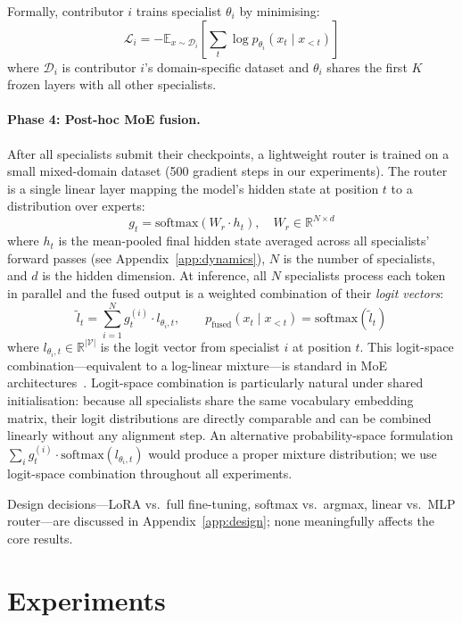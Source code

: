 \documentclass{article}
\begin{document}
Formally, contributor $i$ trains specialist $\theta_i$ by minimising:
\[
\mathcal{L}_i = -\mathbb{E}_{x \sim \mathcal{D}_i} \left[\sum_t \log p_{\theta_i}(x_t \mid x_{<t})\right]
\]
where $\mathcal{D}_i$ is contributor $i$'s domain-specific dataset and $\theta_i$ shares the first $K$ frozen layers with all other specialists.

\paragraph{Phase 4: Post-hoc MoE fusion.} After all specialists submit their checkpoints, a lightweight router is trained on a small mixed-domain dataset (500 gradient steps in our experiments). The router is a single linear layer mapping the model's hidden state at position $t$ to a distribution over experts:
\[
g_t = \mathrm{softmax}\left(W_r \cdot h_t\right), \quad W_r \in \mathbb{R}^{N \times d}
\]
where $h_t$ is the mean-pooled final hidden state averaged across all specialists' forward passes (see Appendix~\ref{app:dynamics}), $N$ is the number of specialists, and $d$ is the hidden dimension. At inference, all $N$ specialists process each token in parallel and the fused output is a weighted combination of their \emph{logit vectors}:
\[
\tilde{l}_t = \sum_{i=1}^{N} g_t^{(i)} \cdot l_{\theta_i,t}, \qquad
p_\text{fused}(x_t \mid x_{<t}) = \mathrm{softmax}\!\left(\tilde{l}_t\right)
\]
where $l_{\theta_i,t} \in \mathbb{R}^{|\mathcal{V}|}$ is the logit vector from specialist $i$ at position $t$. This logit-space combination---equivalent to a log-linear mixture---is standard in MoE architectures~\citep{shazeer2017outrageously,jiang2024mixtral}. Logit-space combination is particularly natural under shared initialisation: because all specialists share the same vocabulary embedding matrix, their logit distributions are directly comparable and can be combined linearly without any alignment step. An alternative probability-space formulation $\sum_i g_t^{(i)} \cdot \mathrm{softmax}(l_{\theta_i,t})$ would produce a proper mixture distribution; we use logit-space combination throughout all experiments.

Design decisions---LoRA vs.\ full fine-tuning, softmax vs.\ argmax, linear vs.\ MLP router---are discussed in Appendix~\ref{app:design}; none meaningfully affects the core results.

\section{Experiments}
\label{sec:experiments}
\end{document}
